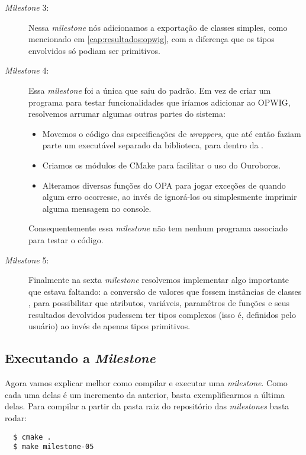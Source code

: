 \begin{description}
  \item[\textit{Milestone} 3:] Nessa \textit{milestone} nós adicionamos a exportação de classes
    simples, como mencionado em \ref{cap:resultados:opwig}, com a diferença que os tipos envolvidos
    só podiam ser primitivos.
    
  \item[\textit{Milestone} 4:] Essa \textit{milestone} foi a única que saiu do padrão.
    Em vez de criar um programa para testar funcionalidades que iríamos adicionar
    ao OPWIG, resolvemos arrumar algumas outras partes do sistema:
    \begin{itemize}
      \item Movemos o código das especificações de \textit{wrappers}, que até então
        faziam parte um executável separado da biblioteca, para dentro da
        .
      \item Criamos os módulos de CMake para facilitar o uso do Ouroboros.
      \item Alteramos diversas funções do OPA para jogar exceções de \CXX{} quando algum erro
        ocorresse, ao invés de ignorá-los ou simplesmente imprimir alguma mensagem no console.
    \end{itemize}
    Consequentemente essa \textit{milestone} não tem nenhum programa associado para testar o
    código.
    
  \item[\textit{Milestone} 5:] Finalmente na sexta \textit{milestone} resolvemos implementar algo
    importante que estava faltando: a conversão de valores que fossem instâncias de classes
    \CXX{}, para possibilitar que atributos, variáveis, paramêtros de funções e seus resultados
    devolvidos pudessem ter tipos complexos (isso é, definidos pelo usuário) ao invés
    de apenas tipos primitivos.
    
\end{description}

\subsection{Executando a \textit{Milestone}}
Agora vamos explicar melhor como compilar e executar uma \textit{milestone}. Como cada 
uma delas é um incremento da anterior, basta exemplificarmos a última delas. Para compilar
a partir da pasta raiz do repositório das \textit{milestones} basta rodar:

\begin{verbatim}
  $ cmake .
  $ make milestone-05
\end{verbatim}

